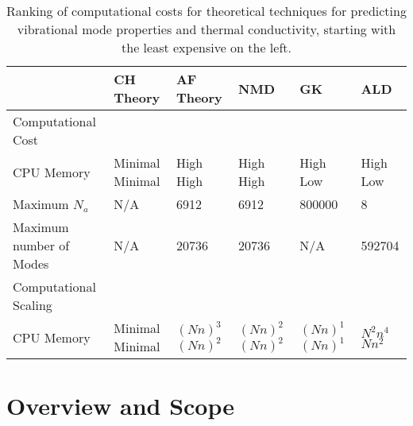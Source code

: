 \begin{center}
\begin{table}
\small
\caption{\label{T-comparison-cost}Ranking of computational costs 
for theoretical 
techniques for predicting vibrational mode properties and thermal 
conductivity, starting with the least expensive on the left.}
\begin{tabular}{p{0.9in}|p{0.9in}|p{0.9in}|p{0.9in}|p{0.9in}|p{0.9in}}
\hline\hline
&CH Theory 
&AF Theory
&NMD
&GK
&ALD\\ 
\hline
Computational Cost\\
\hline
CPU\newline
Memory 
&Minimal \newline Minimal
&High \newline High 
&High \newline High 
&High \newline Low 
&High \newline Low \\
\hline
Maximum $N_a$
&N/A
&6912
&6912
&800000
&8\\
\hline
Maximum number of Modes
&N/A
&20736 
&20736 
&N/A
&592704\\
\hline
Computational Scaling\\
\hline
CPU\newline
Memory 
&Minimal \newline Minimal
&$(Nn)^{3}$ \newline $(Nn)^{2}$ 
&$(Nn)^{2}$ \newline $(Nn)^{2}$ 
&$(Nn)^{1}$ \newline $(Nn)^{1}$ 
&$N^{2}n^{4}$ \newline $Nn^{2}$  \\
\hline\hline
\end{tabular}
\end{table}
\end{center}
\clearpage

\section{\label{S-CompCost}
Overview and Scope}

